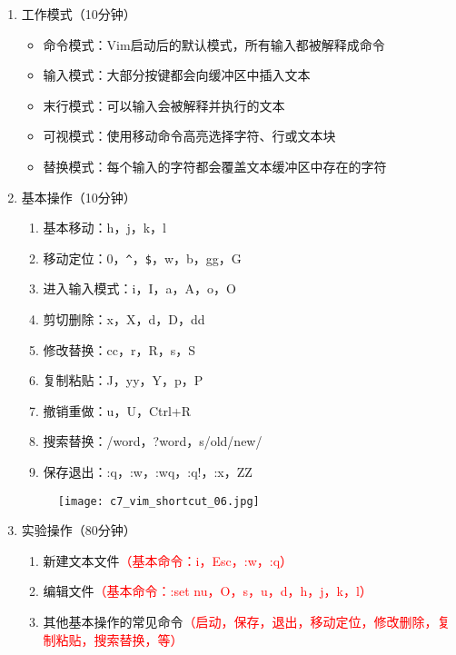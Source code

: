 \documentclass{TIJMUjiaoanSY}
\begin{document}

\firstTail


\newpage
\otherHeader

\noindent
\begin{enumerate}
  \item 工作模式（10分钟）
    \begin{itemize}
      \item 命令模式：Vim启动后的默认模式，所有输入都被解释成命令
      \item 输入模式：大部分按键都会向缓冲区中插入文本
      \item 末行模式：可以输入会被解释并执行的文本
      \item 可视模式：使用移动命令高亮选择字符、行或文本块
      \item 替换模式：每个输入的字符都会覆盖文本缓冲区中存在的字符
    \end{itemize}

  \item 基本操作（10分钟）
    \vspace*{-10pt}
    \begin{multicols}{2}
      \begin{enumerate}
	\item 基本移动：h，j，k，l
	\item 移动定位：0，\verb|^|，\verb|$|，w，b，gg，G
	\item 进入输入模式：i，I，a，A，o，O
	\item 剪切删除：x，X，d，D，dd
	\item 修改替换：cc，r，R，s，S
	\item 复制粘贴：J，yy，Y，p，P
	\item 撤销重做：u，U，Ctrl+R
	\item 搜索替换：/word，?word，s/old/new/
	\item 保存退出：:q，:w，:wq，:q!，:x，ZZ
      \end{enumerate}
    \end{multicols}
    \vspace*{-10pt}
    \begin{figure}[h]
      \centering
      \texttt{[image: c7\_vim\_shortcut\_06.jpg]}
    \end{figure}
    \vspace*{-10pt}

  \item 实验操作（80分钟）
    \begin{enumerate}
      \item 新建文本文件\textcolor{red}{（基本命令：i，Esc，:w，:q）}
      \item 编辑文件\textcolor{red}{（基本命令：:set nu，O，s，u，d，h，j，k，l）}
      \item 其他基本操作的常见命令\textcolor{red}{（启动，保存，退出，移动定位，修改删除，复制粘贴，搜索替换，等）}
    \end{enumerate}
\end{enumerate}

\otherTail
\end{document}
